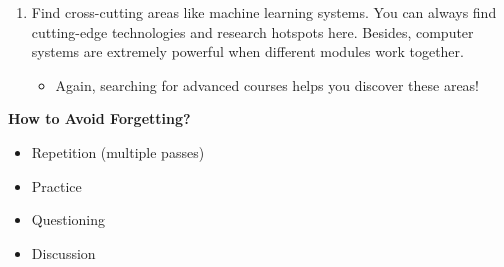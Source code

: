 \documentclass{article}
\begin{document}
\begin{enumerate}
    \item Find cross-cutting areas like machine learning systems.
    You can always find cutting-edge technologies and research hotspots here.
    Besides, computer systems are extremely powerful when different modules work together.
    \begin{itemize}
        \item Again, searching for advanced courses helps you discover these areas!
    \end{itemize}
\end{enumerate}

\noindent
\textbf{How to Avoid Forgetting?}
\begin{itemize}
    \item Repetition (multiple passes)
    \item Practice
    \item Questioning
    \item Discussion
\end{itemize}
\end{document}
